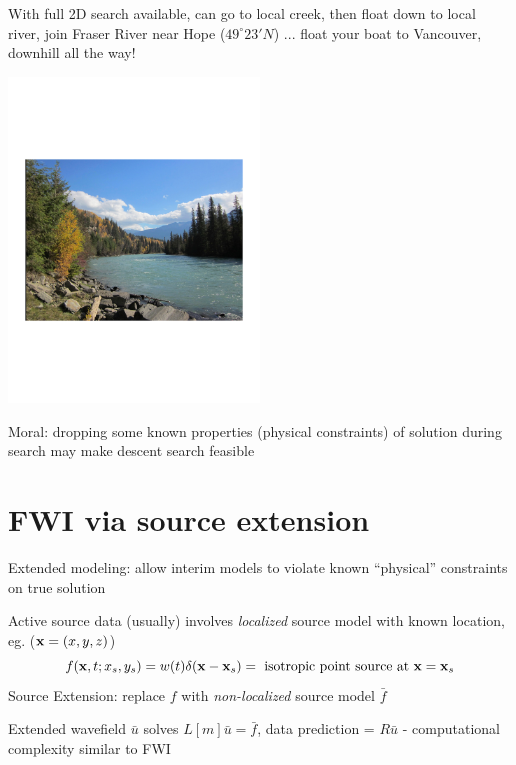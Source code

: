 \documentclass[xcolor=dvipsnames,12pt,aspectratio=169]{beamer}
\newcommand{\of}{\bar{f}}
\newcommand{\ou}{\bar{u}}
\begin{document}
\begin{frame}
With full 2D search available, can go to local creek, then float down to local river, join Fraser River near Hope ($49^{\circ} 23' N$) ... float your boat to Vancouver, downhill all the way!
\vspace{-2.8cm}
\begin{center}
\includegraphics[width=0.5\textwidth]{Fig/fraser.pdf}
\end{center}
\vspace{-3cm}
Moral: dropping some known properties (physical constraints) of solution {\color{blue} during search} may make descent search feasible


\end{frame}

\section{FWI via source extension}
\begin{frame}

{\color{blue} Extended modeling:} allow interim models to violate known ``physical'' constraints on true solution

Active source data (usually) involves {\em localized} source model with known location, eg. ($\mathbf{x}=(x,y,z)$)
\[
f(\mathbf{x},t;x_s,y_s) = w(t) \delta(\mathbf{x}-\mathbf{x}_s) = \mbox{ isotropic point source at }\mathbf{x}=\mathbf{x}_s
\]
{\color{blue} Source Extension}: replace $f$ with {\em non-localized} source model $\of$ 

Extended wavefield $\ou$  solves $L[m]\ou = \of$, data prediction = $R\ou$ - computational complexity similar to FWI


\end{frame}
\end{document}
